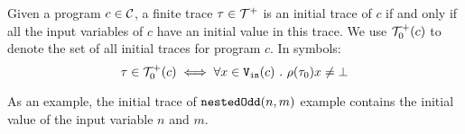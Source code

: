     \begin{defn}
        \label{def:initial_trace}
        Given a program $c\in\mathcal{C}$, a finite trace $\mathtt{\tau}\in\mathcal{T}^{+}$ is an initial trace of $c$ if and only if all the input variables of $c$ have an initial value in this trace. We use $\mathcal{T}^{+}_0(c)$ to denote the set of all initial traces for program $c$. In symbols:
        \[
        \mathtt{\tau} \in \mathcal{T}^{+}_0(c) \iff 
        \forall x \in {\ensuremath{\mathtt{V_{\mathtt{in}}}}}(c) ~.~ \rho(\mathtt{\tau}_0) x \neq \bot
        \]
        \end{defn}
        As an example, the initial trace of $\mathtt{nestedOdd}(n, m)$ example contains the initial value of the input variable $n$ and $m$.


